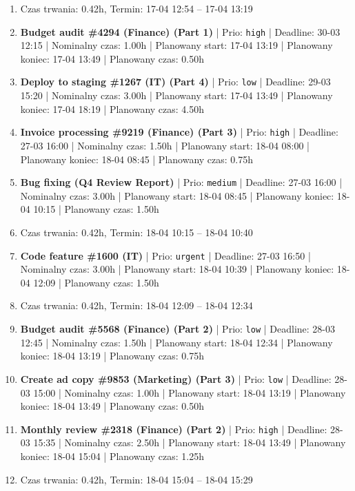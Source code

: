 {\begin{enumerate}
  \item [\textbf{PRZERWA}] Czas trwania: 0.42h, Termin: 17-04 12:54 -- 17-04 13:19
  \item [\textbf{14619}] \textbf{Budget audit \#4294 (Finance) (Part 1)} | Prio: \texttt{high} | Deadline: 30-03 12:15 | Nominalny czas: 1.00h | Planowany start: 17-04 13:19 | Planowany koniec: 17-04 13:49 | Planowany czas: 0.50h
  \item [\textbf{14686}] \textbf{Deploy to staging \#1267 (IT) (Part 4)} | Prio: \texttt{low} | Deadline: 29-03 15:20 | Nominalny czas: 3.00h | Planowany start: 17-04 13:49 | Planowany koniec: 17-04 18:19 | Planowany czas: 4.50h
  \item [\textbf{14622}] \textbf{Invoice processing \#9219 (Finance) (Part 3)} | Prio: \texttt{high} | Deadline: 27-03 16:00 | Nominalny czas: 1.50h | Planowany start: 18-04 08:00 | Planowany koniec: 18-04 08:45 | Planowany czas: 0.75h
  \item [\textbf{14647}] \textbf{Bug fixing (Q4 Review Report)} | Prio: \texttt{medium} | Deadline: 27-03 16:00 | Nominalny czas: 3.00h | Planowany start: 18-04 08:45 | Planowany koniec: 18-04 10:15 | Planowany czas: 1.50h
  \item [\textbf{PRZERWA}] Czas trwania: 0.42h, Termin: 18-04 10:15 -- 18-04 10:40
  \item [\textbf{14605}] \textbf{Code feature \#1600 (IT)} | Prio: \texttt{urgent} | Deadline: 27-03 16:50 | Nominalny czas: 3.00h | Planowany start: 18-04 10:39 | Planowany koniec: 18-04 12:09 | Planowany czas: 1.50h
  \item [\textbf{PRZERWA}] Czas trwania: 0.42h, Termin: 18-04 12:09 -- 18-04 12:34
  \item [\textbf{14693}] \textbf{Budget audit \#5568 (Finance) (Part 2)} | Prio: \texttt{low} | Deadline: 28-03 12:45 | Nominalny czas: 1.50h | Planowany start: 18-04 12:34 | Planowany koniec: 18-04 13:19 | Planowany czas: 0.75h
  \item [\textbf{14679}] \textbf{Create ad copy \#9853 (Marketing) (Part 3)} | Prio: \texttt{low} | Deadline: 28-03 15:00 | Nominalny czas: 1.00h | Planowany start: 18-04 13:19 | Planowany koniec: 18-04 13:49 | Planowany czas: 0.50h
  \item [\textbf{14618}] \textbf{Monthly review \#2318 (Finance) (Part 2)} | Prio: \texttt{high} | Deadline: 28-03 15:35 | Nominalny czas: 2.50h | Planowany start: 18-04 13:49 | Planowany koniec: 18-04 15:04 | Planowany czas: 1.25h
  \item [\textbf{PRZERWA}] Czas trwania: 0.42h, Termin: 18-04 15:04 -- 18-04 15:29

\end{enumerate}}
